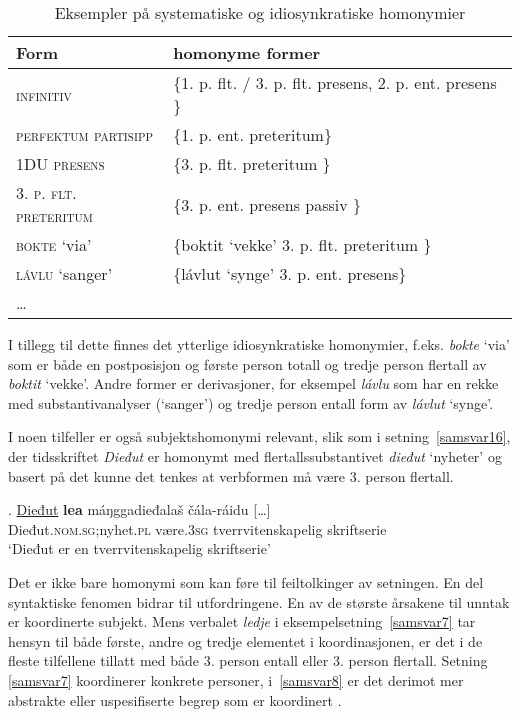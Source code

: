\documentclass{flammie}
\begin{document}
\begin{table}[htb]
    \centering
    \small
    \begin{tabular}{l|l}
         \textbf{Form} & \textbf{homonyme former} \\
         \hline
         \textsc{infinitiv} & \{1. p. flt. / 3. p. flt. presens, 2. p. ent. presens \} \\
         \textsc{perfektum partisipp} & \{1. p. ent. preteritum\} \\
         \textsc{1DU presens} & \{3. p. flt. preteritum \} \\
         \textsc{3. p. flt. preteritum} & \{3. p. ent. presens passiv \} \\
         \hline
         \hline
         \textsc{bokte} `via' & \{boktit `vekke' 3. p. flt. preteritum \} \\
         \textsc{lávlu} `sanger' & \{lávlut `synge' 3. p. ent. presens\} \\
         \textsc{\ldots} & \\
         \end{tabular}
    \caption{Eksempler på systematiske og idiosynkratiske homonymier\label{systematiskhomonymi}}
\end{table}


I tillegg til dette finnes det ytterlige idiosynkratiske homonymier, f.eks.
\textit{bokte} `via' som er både en postposisjon og første person totall og
tredje person flertall av \textit{boktit} `vekke'.  Andre former er
derivasjoner, for eksempel \textit{lávlu} som har en rekke med
substantivanalyser (`sanger') og tredje person entall form av \textit{lávlut}
`synge'.

I noen tilfeller er også subjektshomonymi relevant, slik som i
setning~\ref{samsvar16}, der tidsskriftet \textit{Dieđut} er homonymt med
flertallssubstantivet \textit{dieđut} `nyheter' og basert på det kunne det
tenkes at verbformen må være 3. person flertall.

\exg. \underline{Dieđut} \textbf{lea} máŋggadieđalaš čála-ráidu [\ldots]\label{samsvar16}\\
Dieđut\textsc{.nom.sg};nyhet\textsc{.pl} være\textsc{.3sg} tverrvitenskapelig skriftserie \\
`Dieđut {er} en tverrvitenskapelig skriftserie'

Det er ikke bare homonymi som kan føre til feiltolkinger av setningen. En del
syntaktiske fenomen bidrar til utfordringene. En av de største årsakene til
unntak er koordinerte subjekt. Mens verbalet \textit{ledje} i
eksempelsetning~\ref{samsvar7} tar hensyn til både første, andre og tredje
elementet i koordinasjonen, er det i de fleste tilfellene tillatt med både 3.
person entall eller 3. person flertall.  Setning \ref{samsvar7} koordinerer
konkrete personer, i~\ref{samsvar8} er det derimot mer abstrakte eller
uspesifiserte begrep som er koordinert .
\end{document}
